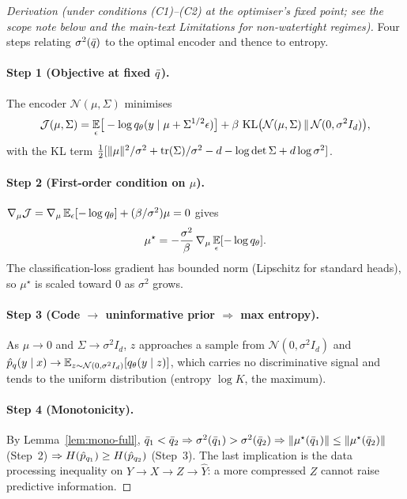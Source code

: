 \begin{proof}[Derivation (under conditions (C1)--(C2) at the optimiser's fixed point; see the
scope note below and the main-text Limitations for non-watertight regimes)]
Four steps relating $\sigma^2(\bar{q})$ to the optimal encoder and thence to entropy.

\paragraph{Step 1 (Objective at fixed $\bar{q}$).}
The encoder $\mathcal{N}(\mu,\Sigma)$ minimises
\begin{equation}
\mathcal{J}(\mu,\Sigma) = \operatorname*{\mathbb{E}}_\epsilon\!\big[-\log q_\theta(y\mid\mu+\Sigma^{1/2}\epsilon)\big]
+ \beta\,\operatorname{KL}\!\big(\mathcal{N}(\mu,\Sigma)\,\|\,\mathcal{N}(0,\sigma^2 I_d)\big),
\label{eq:a1-p2-1}
\end{equation}
with the KL term $\tfrac{1}{2}[\|\mu\|^2/\sigma^2 + \operatorname{tr}(\Sigma)/\sigma^2 - d - \log\det\Sigma + d\log\sigma^2]$.

\paragraph{Step 2 (First-order condition on $\mu$).}
$\nabla_\mu\mathcal{J}=\nabla_\mu\operatorname*{\mathbb{E}}_\epsilon[-\log q_\theta] + (\beta/\sigma^2)\mu = 0$ gives
\begin{equation}
\mu^\star = -\frac{\sigma^2}{\beta}\,\nabla_\mu\operatorname*{\mathbb{E}}_\epsilon[-\log q_\theta].
\label{eq:a1-p2-2}
\end{equation}
The classification-loss gradient has bounded norm (Lipschitz for standard heads), so $\mu^\star$ is
scaled toward $0$ as $\sigma^2$ grows.

\paragraph{Step 3 (Code $\to$ uninformative prior $\Rightarrow$ max entropy).}
As $\mu\to 0$ and $\Sigma\to\sigma^2 I_d$, $z$ approaches a sample from $\mathcal{N}(0,\sigma^2 I_d)$ and
$\hat{p}_q(y\mid x)\to\operatorname*{\mathbb{E}}_{z\sim\mathcal{N}(0,\sigma^2 I_d)}[q_\theta(y\mid z)]$, which carries no
discriminative signal and tends to the uniform distribution (entropy $\log K$, the maximum).

\paragraph{Step 4 (Monotonicity).}
By Lemma~\ref{lem:mono-full}, $\bar{q}_1<\bar{q}_2\Rightarrow\sigma^2(\bar{q}_1)>\sigma^2(\bar{q}_2)
\Rightarrow\|\mu^\star(\bar{q}_1)\|\leq\|\mu^\star(\bar{q}_2)\|$ (Step~2)
$\Rightarrow H(\hat{p}_{q_1})\geq H(\hat{p}_{q_2})$ (Step~3). The last implication is the data
processing inequality on $Y\to X\to Z\to\hat{Y}$: a more compressed $Z$ cannot raise predictive
information.
\end{proof}

